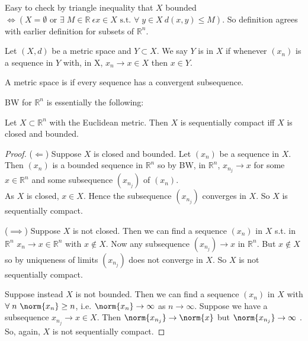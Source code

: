 \begin{remark}
    Easy to check by triangle inequality that $X$ bounded $\iff (X = \emptyset \text{ or } \exists \; M \in \mathbb{R} \ \epsilon x \in X \text{ s.t. } \forall \; y \in X \ d(x, y) \leq M)$.
    So definition agrees with earlier definition for subsets of $\mathbb{R}^n$.
\end{remark} 

\begin{definition}
    Let $(X, d)$ be a metric space and $Y \subset X$.
    We say $Y$ is  in $X$ if whenever $(x_n)$ is a sequence in $Y$ with, in X, $x_n \to x \in X$ then $x \in Y$.
\end{definition} 

\begin{definition}
    A metric space is  if every sequence has a convergent subsequence.
\end{definition}  

BW for $\mathbb{R}^n$ is essentially the following:
\begin{theorem} \label{thm:20}
    Let $X \subset \mathbb{R}^n$ with the Euclidean metric.
    Then $X$ is sequentially compact iff $X$ is closed and bounded.
\end{theorem} 

\begin{proof}
    ($\Longleftarrow$) Suppose $X$ is closed and bounded.
    Let $(x_n)$ be a sequence in $X$.
    Then $(x_n)$ is a bounded sequence in $\mathbb{R}^n$ so by BW, in $\mathbb{R}^n$, $x_{n_j} \to x$ for some $ x \in \mathbb{R}^n$ and some subsequence $(x_{n_j})$ of $(x_n)$. \\
    As $X$ is closed, $x \in X$.
    Hence the subsequence $(x_{n_j})$ converges in $X$.
    So $X$ is sequentially compact.

    ($\implies$) Suppose $X$ is not closed.
    Then we can find a sequence $(x_n)$ in $X$ s.t. in $\mathbb{R}^n$ $x_n \to x \in \mathbb{R}^n$ with $x \notin X$.
    Now any subsequence $(x_{n_j}) \to x$ in $\mathbb{R}^n$.
    But $x \notin X$ so by uniqueness of limits $(x_{n_j})$ does not converge in $X$.
    So $X$ is not sequentially compact.

    Suppose instead $X$ is not bounded.
    Then we can find a sequence $(x_n)$ in $X$ with $\forall \; n \ \norm{x_n} \geq n$, i.e. $\norm{x_n} \to \infty$ as $n \to \infty$.
    Suppose we have a subsequence $x_{n_j} \to x \in X$.
    Then $\norm{x_{n_j}} \to \norm{x}$ but $\norm{x_{n_j}} \to \infty$ \Lightning.
    So, again, $X$ is not sequentially compact.
\end{proof} 